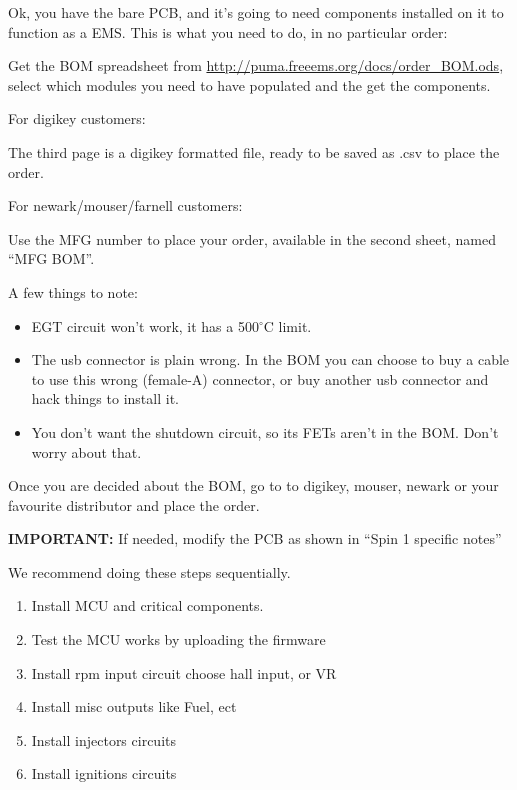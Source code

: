 \documentclass[12pt,a4paper,titlepage]{article}
\begin{document}
Ok, you have the bare PCB, and it's going to need components installed on it to function as a EMS. This is what you need to do, in no particular order:
\newline

Get the BOM spreadsheet from \url{http://puma.freeems.org/docs/order_BOM.ods}, select which modules you need to have populated and the get the components.
\newline

For digikey customers:

The third page is a digikey formatted file, ready to be saved as .csv to place the order.
\newline

For newark/mouser/farnell customers:

Use the MFG number to place your order, available in the second sheet, named ``MFG BOM''.



A few things to note:
\begin{itemize}
\item EGT circuit won't work, it has a 500$^{\circ}$C limit.
\item The usb connector is plain wrong. In the BOM you can choose to buy a cable to use this wrong (female-A) connector, or buy another usb connector and hack things to install it.
\item You don't want the shutdown circuit, so its FETs aren't in the BOM. Don't worry about that.
\end{itemize}

Once you are decided about the BOM, go to to digikey, mouser, newark or your favourite distributor and place the order.
\newline

\textbf{IMPORTANT:} If needed, modify the PCB as shown in ``Spin 1 specific notes''
\newline

We recommend doing these steps sequentially.

\begin{enumerate}
\item Install MCU and critical components.
\item Test the MCU works by uploading the firmware
\item Install rpm input circuit choose hall input, or VR
\item Install misc outputs like Fuel, ect
\item Install injectors circuits
\item Install ignitions circuits
\end{enumerate}
\end{document}
